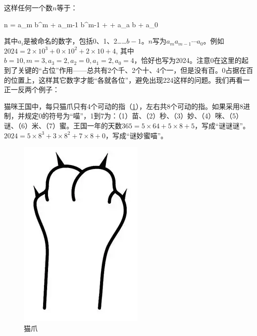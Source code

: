 \documentclass[b5paper]{ctexart}
\begin{document}
这样任何一个数$n$等于：

\be
n = a_m b^m + a_{m-1} b^{m-1} + \cdots + a_a b + a_0
\label{eq:pos-rep}
\ee

其中$a_i$是被命名的数字，包括0、1、2……$b-1$。$n$写为$a_ma_{m-1} \cdots a_0$。例如$2024 = 2 \times 10^3 + 0 \times 10^2 + 2 \times 10 + 4$, 其中$b = 10, m = 3, a_3 = 2, a_2 = 0, a_1 = 2, a_0 = 4$，恰好也写为2024。注意0在这里的起到了关键的“占位”作用——总共有2个千、2个十、4个一，但是没有百。0占据在百的位置上，这样其它数字才能“各就各位”，避免出现224这样的问题。我们再看一正一反两个例子：

\begin{example}
猫咪王国中，每只猫爪只有4个可动的指（\cref{fig:cat-paw}），左右共8个可动的指。如果采用8进制，并规定0的符号为“喵”，1到7为：（1）苗、（2）秒、（3）妙、（4）咪、（5）谜、（6）米、（7）蜜。王国一年的天数$365 = 5 \times 64 + 5 \times 8 + 5$，写成“谜谜谜”。$2024 = 5 \times 8^3 + 3 \times 8^2 + 7 \times 8 + 0$，写成“谜妙蜜喵”。

\begin{figure}[htbp]
 \centering
 \includegraphics[scale=0.8]{img/cat-paw}
 \caption{猫爪}
 \label{fig:cat-paw}
\end{figure}

\end{example}
\end{document}
